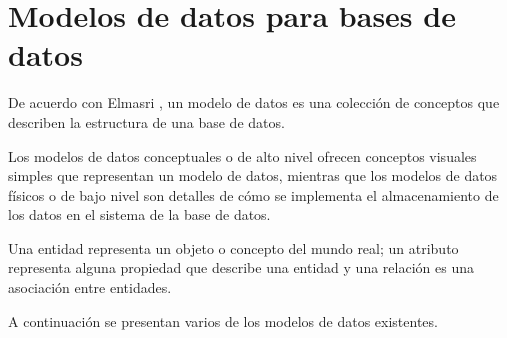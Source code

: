\section{Modelos de datos para bases de datos}
De acuerdo con Elmasri \cite{ramez_elmasri_fundamentos_nodate}, un modelo de datos es una colección de conceptos que describen la estructura de una base de datos. 


Los modelos de datos conceptuales o de alto nivel ofrecen conceptos visuales simples que representan un modelo de datos, mientras que los modelos de datos físicos o de bajo nivel son detalles de cómo se implementa el almacenamiento de los datos en el sistema de la base de datos.


Una entidad representa un objeto o concepto del mundo real; un atributo representa alguna propiedad que describe una entidad y una relación es una asociación entre entidades.


A continuación se presentan varios de los modelos de datos existentes.